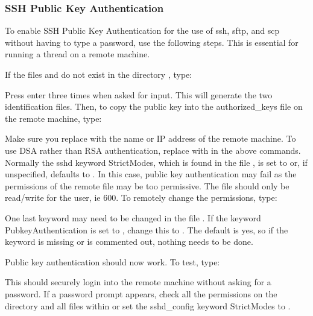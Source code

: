 \subsubsection{SSH Public Key Authentication}

To enable SSH Public Key Authentication for the use of ssh, sftp, and scp without having to
type a password, use the following steps.  This is essential for running a thread on a
remote machine.

If the files 
 and 
 do not exist in the directory 
, type:



Press enter three times when asked for input.  This will generate the two identification
files.  Then, to copy the public key into the authorized\_keys file on the remote machine,
type:



Make sure you replace 
 with the name or IP address of the remote machine.  To use
DSA rather than RSA authentication, replace 
 with 
 in the above commands.
Normally the sshd keyword StrictModes, which is found in the file 
, is
set to 
 or, if unspecified, defaults to 
.  In this case, public key authentication
may fail as the permissions of the remote file 
 may be too
permissive.  The file should only be read/write for the user, ie 600.  To remotely change
the permissions, type:



One last keyword may need to be changed in the file 
.  If the keyword
PubkeyAuthentication is set to 
, change this to 
.  The default is yes, so if the
keyword is missing or is commented out, nothing needs to be done.

Public key authentication should now work.  To test, type:



This should securely login into the remote machine without asking for a password.  If a
password prompt appears, check all the permissions on the directory 
 and all files
within or set the sshd\_config keyword StrictModes to 
.

